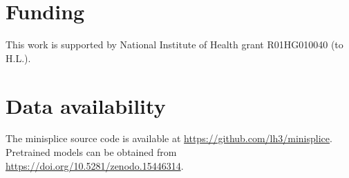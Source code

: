 \documentclass[webpdf,contemporary,large,namedate]{oup-authoring-template}%
\begin{document}
\section*{Funding}

This work is supported by National Institute of Health grant R01HG010040 (to H.L.).

\section*{Data availability}

The minisplice source code is available at \url{https://github.com/lh3/minisplice}.
Pretrained models can be obtained from \url{https://doi.org/10.5281/zenodo.15446314}.


{\sffamily\small
}
\end{document}
